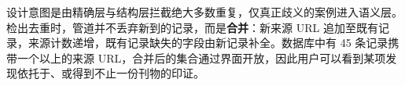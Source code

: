 \documentclass[11pt]{article}
\begin{document}
{\cjkfont 设\allowbreak 计\allowbreak 意\allowbreak 图\allowbreak 是\allowbreak 由\allowbreak 精\allowbreak 确\allowbreak 层\allowbreak 与\allowbreak 结\allowbreak 构\allowbreak 层\allowbreak 拦\allowbreak 截\allowbreak 绝\allowbreak 大\allowbreak 多\allowbreak 数\allowbreak 重\allowbreak 复\allowbreak ，\allowbreak 仅\allowbreak 真\allowbreak 正\allowbreak 歧\allowbreak 义\allowbreak 的\allowbreak 案\allowbreak 例\allowbreak 进\allowbreak 入\allowbreak 语\allowbreak 义\allowbreak 层\allowbreak 。\allowbreak 检\allowbreak 出\allowbreak 去\allowbreak 重\allowbreak 时\allowbreak ，\allowbreak 管\allowbreak 道\allowbreak 并\allowbreak 不\allowbreak 丢\allowbreak 弃\allowbreak 新\allowbreak 到\allowbreak 的\allowbreak 记\allowbreak 录\allowbreak ，\allowbreak 而\allowbreak 是}\textbf{{\cjkfont 合\allowbreak 并}}{\cjkfont ：\allowbreak 新\allowbreak 来\allowbreak 源} URL {\cjkfont 追\allowbreak 加\allowbreak 至\allowbreak 既\allowbreak 有\allowbreak 记\allowbreak 录\allowbreak ，\allowbreak 来\allowbreak 源\allowbreak 计\allowbreak 数\allowbreak 递\allowbreak 增\allowbreak ，\allowbreak 既\allowbreak 有\allowbreak 记\allowbreak 录\allowbreak 缺\allowbreak 失\allowbreak 的\allowbreak 字\allowbreak 段\allowbreak 由\allowbreak 新\allowbreak 记\allowbreak 录\allowbreak 补\allowbreak 全\allowbreak 。\allowbreak 数\allowbreak 据\allowbreak 库\allowbreak 中\allowbreak 有} 45 {\cjkfont 条\allowbreak 记\allowbreak 录\allowbreak 携\allowbreak 带\allowbreak 一\allowbreak 个\allowbreak 以\allowbreak 上\allowbreak 的\allowbreak 来\allowbreak 源} URL{\cjkfont ，\allowbreak 合\allowbreak 并\allowbreak 后\allowbreak 的\allowbreak 集\allowbreak 合\allowbreak 通\allowbreak 过\allowbreak 界\allowbreak 面\allowbreak 开\allowbreak 放\allowbreak ，\allowbreak 因\allowbreak 此\allowbreak 用\allowbreak 户\allowbreak 可\allowbreak 以\allowbreak 看\allowbreak 到\allowbreak 某\allowbreak 项\allowbreak 发\allowbreak 现\allowbreak 依\allowbreak 托\allowbreak 于\allowbreak 、\allowbreak 或\allowbreak 得\allowbreak 到\allowbreak 不\allowbreak 止\allowbreak 一\allowbreak 份\allowbreak 刊\allowbreak 物\allowbreak 的\allowbreak 印\allowbreak 证\allowbreak 。}
\end{document}
